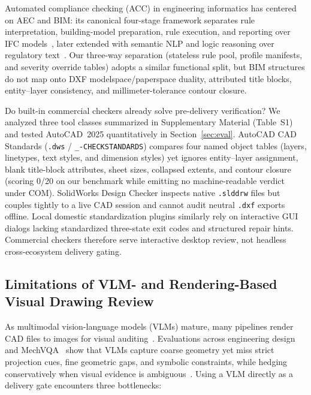 \documentclass[nocopyright,nolists,upint,varvw,hyphenate]{asmejour}
\begin{document}
Automated compliance checking (ACC) in engineering informatics has centered on AEC and BIM: its canonical four-stage framework separates rule interpretation, building-model preparation, rule execution, and reporting over IFC models~\cite{eastman2009automatic}, later extended with semantic NLP and logic reasoning over regulatory text~\cite{zhang2017integrating}. Our three-way separation (stateless rule pool, profile manifests, and severity override tables) adopts a similar functional split, but BIM structures do not map onto DXF modelspace/paperspace duality, attributed title blocks, entity--layer consistency, and millimeter-tolerance contour closure.

Do built-in commercial checkers already solve pre-delivery verification? We analyzed three tool classes summarized in Supplementary Material (Table~S1) and tested AutoCAD~2025 quantitatively in Section~\ref{sec:eval}. AutoCAD CAD Standards (\texttt{.dws} / \texttt{\_-CHECKSTANDARDS}) compares four named object tables (layers, linetypes, text styles, and dimension styles) yet ignores entity--layer assignment, blank title-block attributes, sheet sizes, collapsed extents, and contour closure (scoring 0/20 on our benchmark while emitting no machine-readable verdict under COM). SolidWorks Design Checker inspects native \texttt{.slddrw} files but couples tightly to a live CAD session and cannot audit neutral \texttt{.dxf} exports offline. Local domestic standardization plugins similarly rely on interactive GUI dialogs lacking standardized three-state exit codes and structured repair hints. Commercial checkers therefore serve interactive desktop review, not headless cross-ecosystem delivery gating.

\subsection{Limitations of VLM- and Rendering-Based Visual Drawing Review}

As multimodal vision-language models (VLMs) mature, many pipelines render CAD files to images for visual auditing~\cite{picard2025concept,kou2026mechvqa}. Evaluations across engineering design~\cite{picard2025concept} and MechVQA~\cite{kou2026mechvqa} show that VLMs capture coarse geometry yet miss strict projection cues, fine geometric gaps, and symbolic constraints, while hedging conservatively when visual evidence is ambiguous~\cite{picard2025concept}. Using a VLM directly as a delivery gate encounters three bottlenecks:
\end{document}
